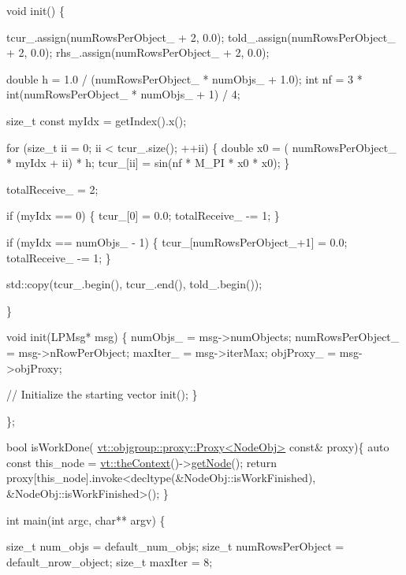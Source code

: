 \begin{DoxyCodeInclude}
  \textcolor{keywordtype}{void} init() \{

    tcur\_.assign(numRowsPerObject\_ + 2, 0.0);
    told\_.assign(numRowsPerObject\_ + 2, 0.0);
    rhs\_.assign(numRowsPerObject\_ + 2, 0.0);

    \textcolor{keywordtype}{double} h = 1.0 / (numRowsPerObject\_ * numObjs\_ + 1.0);
    \textcolor{keywordtype}{int} nf = 3 * int(numRowsPerObject\_ * numObjs\_ + 1) / 4;

    \textcolor{keywordtype}{size\_t} \textcolor{keyword}{const} myIdx = getIndex().x();

    \textcolor{keywordflow}{for} (\textcolor{keywordtype}{size\_t} ii = 0; ii < tcur\_.size(); ++ii) \{
      \textcolor{keywordtype}{double} x0 = ( numRowsPerObject\_ * myIdx + ii) * h;
      tcur\_[ii] = sin(nf * M\_PI * x0 * x0);
    \}

    totalReceive\_ = 2;

    \textcolor{keywordflow}{if} (myIdx == 0) \{
      tcur\_[0] = 0.0;
      totalReceive\_ -= 1;
    \}

    \textcolor{keywordflow}{if} (myIdx == numObjs\_ - 1) \{
      tcur\_[numRowsPerObject\_+1] = 0.0;
      totalReceive\_ -= 1;
    \}

    std::copy(tcur\_.begin(), tcur\_.end(), told\_.begin());

  \}


  \textcolor{keywordtype}{void} init(LPMsg* msg) \{
    numObjs\_ = msg->numObjects;
    numRowsPerObject\_ = msg->nRowPerObject;
    maxIter\_ = msg->iterMax;
    objProxy\_ = msg->objProxy;

    \textcolor{comment}{// Initialize the starting vector}
    init();
  \}

\};

\textcolor{keywordtype}{bool} isWorkDone( \hyperlink{structvt_1_1objgroup_1_1proxy_1_1_proxy}{vt::objgroup::proxy::Proxy<NodeObj>} \textcolor{keyword}{const}& proxy)\{
  \textcolor{keyword}{auto} \textcolor{keyword}{const} this\_node = \hyperlink{namespacevt_a26551fe0e6e6a1371111df5b12c7e92c}{vt::theContext}()->\hyperlink{structvt_1_1ctx_1_1_context_a0d52c263ce8516546a67443d9a86fa5f}{getNode}();
  \textcolor{keywordflow}{return} proxy[this\_node].invoke<decltype(&NodeObj::isWorkFinished), &NodeObj::isWorkFinished>();
\}

\textcolor{keywordtype}{int} main(\textcolor{keywordtype}{int} argc, \textcolor{keywordtype}{char}** argv) \{

  \textcolor{keywordtype}{size\_t} num\_objs = default\_num\_objs;
  \textcolor{keywordtype}{size\_t} numRowsPerObject = default\_nrow\_object;
  \textcolor{keywordtype}{size\_t} maxIter = 8;


\end{DoxyCodeInclude}
